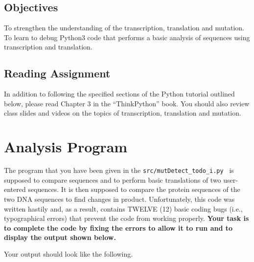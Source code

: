 \subsection*{Objectives}

To strengthen the understanding of the transcription, translation and mutation. To learn to debug Python3 code that performs a basic analysis of sequences using transcription and translation.

\vspace*{-.1in}
\subsection*{Reading Assignment}
\vspace*{-.1in}
In addition to following the specified sections of the Python tutorial outlined below, please read Chapter 3 in the ``ThinkPython'' book. You should also review class slides and videos on the topics of transcription, translation and mutation. 


\section*{Analysis Program}

The program that you have been given in the {\color{red} \tt src/mutDetect\_todo\_i.py \color{black}} is supposed to compare sequences and to perform basic translations of two user-entered sequences. It is then supposed to compare the protein sequences of the two DNA sequences to find changes in product. Unfortunately, this code was written hastily and, as a result, contains TWELVE (12) basic coding bugs (i.e., typographical errors) that prevent the code from working properly. \textbf{Your task is to complete the code by fixing the errors to allow it to run and to display the output shown below.}



Your output should look like the following.

